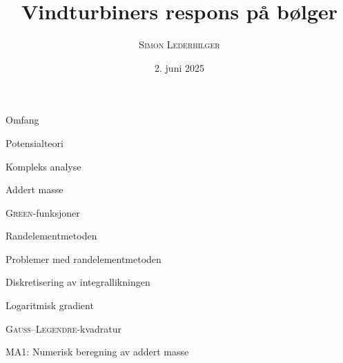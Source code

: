 \documentclass[gray]{beamer}
\title{Vindturbiners respons på bølger}
\subtitle{\emph{\headcourse}}
\author{\textsc{Simon Lederhilger}}
\date{2. juni 2025}
\begin{document}
\maketitle
\begin{frame}{Omfang}
  
\end{frame}

\begin{frame}{Potensialteori}
  
\end{frame}

\begin{frame}{Kompleks analyse}
  
\end{frame}

\begin{frame}{Addert masse}
  
\end{frame}

\begin{frame}{\textsc{Green}-funksjoner}
  
\end{frame}

\begin{frame}{Randelementmetoden}
  
\end{frame}

\begin{frame}{Problemer med randelementmetoden}
  
\end{frame}

\begin{frame}{Diskretisering av integrallikningen}
  
\end{frame}

\begin{frame}{Logaritmisk gradient}
  
\end{frame}

\begin{frame}{\textsc{Gauss}--\textsc{Legendre}-kvadratur}
  
\end{frame}

\begin{frame}{MA1: Numerisk beregning av addert masse}
  
\end{frame}
\end{document}
